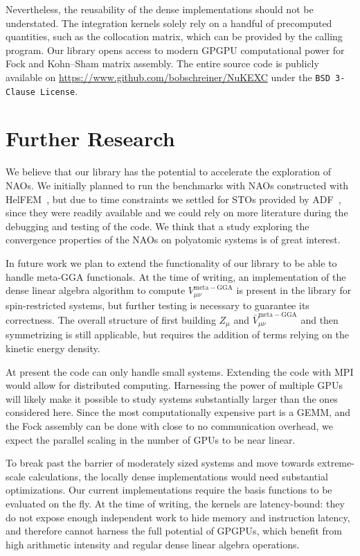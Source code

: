 \documentclass{article}
\begin{document}
Nevertheless, the reusability of the dense implementations should not
be understated. The integration kernels solely rely on a handful
of precomputed quantities, such as the collocation matrix, which can
be provided by the calling program. Our library opens access to
modern GPGPU computational power for Fock and Kohn--Sham
matrix assembly. The entire source code is publicly available on
\href{https://www.github.com/bobschreiner/NuKEXC}{https://www.github.com/bobschreiner/NuKEXC}
under the
\texttt{BSD 3-Clause License}.

\section{Further Research}\label{sec:further_research}

We believe that our library has the potential to accelerate the
exploration of NAOs. We initially planned to run the benchmarks with
NAOs constructed with HelFEM~\cite{Lehtola2019, Lehtola2019a}, but due
to time constraints we settled for STOs provided by
ADF~\cite{VanLenthe2003}, since they were readily
available and we could rely on more literature during the debugging
and testing of the code. We think that a study exploring the
convergence properties of the NAOs on polyatomic systems is of
great interest.

In future work we plan to extend the functionality of our library to
be able to handle meta-GGA functionals. At the time of writing, an
implementation of the
dense linear algebra algorithm to compute
$V_{\mu\nu}^\mathrm{meta-GGA}$ is present in the library for
spin-restricted systems,
but further testing is necessary to guarantee its correctness. The
overall structure of first building \( Z_\mu \) and
\(\bar{V}_{\mu\nu}^\mathrm{meta-GGA}\) and then symmetrizing is still
applicable, but requires the addition of terms relying on the kinetic
energy density.

At present the code can only handle small systems. Extending the
code with MPI would allow for distributed computing. Harnessing the
power of multiple GPUs will likely make it possible to study systems
substantially larger than the ones considered here. Since the most
computationally expensive part is a GEMM, and the Fock assembly can be
done with close to no communication overhead, we expect the parallel
scaling in the number of GPUs to be near linear.

To break past the barrier of moderately sized systems and move
towards extreme-scale calculations, the locally dense
implementations would need substantial optimizations. Our current
implementations require the basis functions to be evaluated on the
fly. At the time of writing, the kernels are latency-bound: they do not
expose enough independent work to hide memory and instruction latency,
and therefore cannot harness the full potential of GPGPUs, which
benefit from high arithmetic intensity and regular dense linear
algebra operations.
\end{document}
